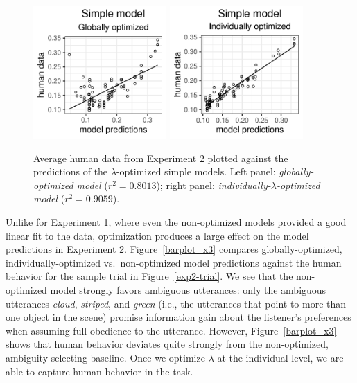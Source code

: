 \documentclass[11pt,a4paper]{article}
\newcommand{\gcs}[1]{\textcolor{blue}{[gcs: #1]}}
\begin{document}
\begin{figure}[ht]
	\centering
	\includegraphics[width=2in]{images/x3_m21.pdf}
	\includegraphics[width=2in]{images/x3_m11.pdf}
	\caption{Average human data from Experiment 2 plotted against the predictions of the $\lambda$-optimized simple models.
		Left panel: \emph{globally-optimized  model} ($r^{2}=0.8013$);
		right panel: \emph{individually-$\lambda$-optimized model} ($r^{2}=0.9059$). }
	\label{global-individual-x3}
\end{figure}


Unlike for Experiment 1, where even the non-optimized models provided a good linear fit to the data, optimization produces a large effect on the model predictions in Experiment 2.
Figure~\ref{barplot_x3} compares globally-optimized, individually-optimized vs.~non-optimized model predictions against the human behavior for the sample trial in Figure~\ref{exp2-trial}. 
We see that the non-optimized model strongly favors ambiguous utterances:
only the ambiguous utterances \textit{cloud}, \textit{striped}, and \textit{green}
(i.e., the utterances that point to more than one object in the scene)
promise information gain about the listener's preferences when assuming full obedience to the utterance.
However, Figure~\ref{barplot_x3} shows that human behavior deviates quite strongly from the non-optimized, ambiguity-selecting baseline.
Once we optimize $\lambda$ at the individual level, we are able to capture human behavior in the task.
\end{document}
